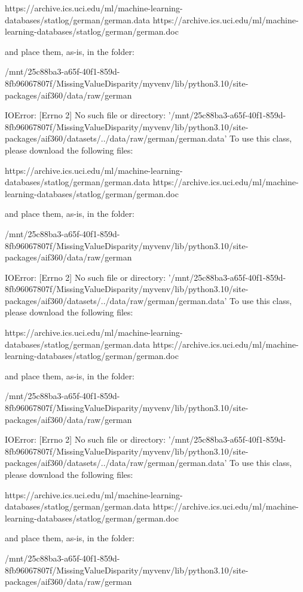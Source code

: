 	https://archive.ics.uci.edu/ml/machine-learning-databases/statlog/german/german.data
	https://archive.ics.uci.edu/ml/machine-learning-databases/statlog/german/german.doc

and place them, as-is, in the folder:

	/mnt/25c88ba3-a65f-40f1-859d-8fb96067807f/MissingValueDisparity/myvenv/lib/python3.10/site-packages/aif360/data/raw/german

IOError: [Errno 2] No such file or directory: '/mnt/25c88ba3-a65f-40f1-859d-8fb96067807f/MissingValueDisparity/myvenv/lib/python3.10/site-packages/aif360/datasets/../data/raw/german/german.data'
To use this class, please download the following files:

	https://archive.ics.uci.edu/ml/machine-learning-databases/statlog/german/german.data
	https://archive.ics.uci.edu/ml/machine-learning-databases/statlog/german/german.doc

and place them, as-is, in the folder:

	/mnt/25c88ba3-a65f-40f1-859d-8fb96067807f/MissingValueDisparity/myvenv/lib/python3.10/site-packages/aif360/data/raw/german

\midrule
{}IOError: [Errno 2] No such file or directory: '/mnt/25c88ba3-a65f-40f1-859d-8fb96067807f/MissingValueDisparity/myvenv/lib/python3.10/site-packages/aif360/datasets/../data/raw/german/german.data'
To use this class, please download the following files:

	https://archive.ics.uci.edu/ml/machine-learning-databases/statlog/german/german.data
	https://archive.ics.uci.edu/ml/machine-learning-databases/statlog/german/german.doc

and place them, as-is, in the folder:

	/mnt/25c88ba3-a65f-40f1-859d-8fb96067807f/MissingValueDisparity/myvenv/lib/python3.10/site-packages/aif360/data/raw/german

IOError: [Errno 2] No such file or directory: '/mnt/25c88ba3-a65f-40f1-859d-8fb96067807f/MissingValueDisparity/myvenv/lib/python3.10/site-packages/aif360/datasets/../data/raw/german/german.data'
To use this class, please download the following files:

	https://archive.ics.uci.edu/ml/machine-learning-databases/statlog/german/german.data
	https://archive.ics.uci.edu/ml/machine-learning-databases/statlog/german/german.doc

and place them, as-is, in the folder:

	/mnt/25c88ba3-a65f-40f1-859d-8fb96067807f/MissingValueDisparity/myvenv/lib/python3.10/site-packages/aif360/data/raw/german


